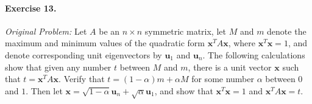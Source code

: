 \documentclass[11pt, letterpaper]{article}
\theoremstyle{definition}
\theoremstyle{remark}
\begin{document}
\paragraph{Exercise 13.}
\emph{Original Problem:} Let $A$ be an $n \times n$ symmetric matrix, let $M$ and $m$ denote the maximum and minimum values of the quadratic form $\mathbf{x}^T A \mathbf{x}$, where $\mathbf{x}^T \mathbf{x} = 1$, and denote corresponding unit eigenvectors by $\mathbf{u}_1$ and $\mathbf{u}_n$. The following calculations show that given any number $t$ between $M$ and $m$, there is a unit vector $\mathbf{x}$ such that $t = \mathbf{x}^T A \mathbf{x}$. Verify that $t = (1 - \alpha)m + \alpha M$ for some number $\alpha$ between $0$ and $1$. Then let $\mathbf{x} = \sqrt{1 - \alpha}\mathbf{u}_n + \sqrt{\alpha}\mathbf{u}_1$, and show that $\mathbf{x}^T \mathbf{x} = 1$ and $\mathbf{x}^T A \mathbf{x} = t$.
\end{document}
